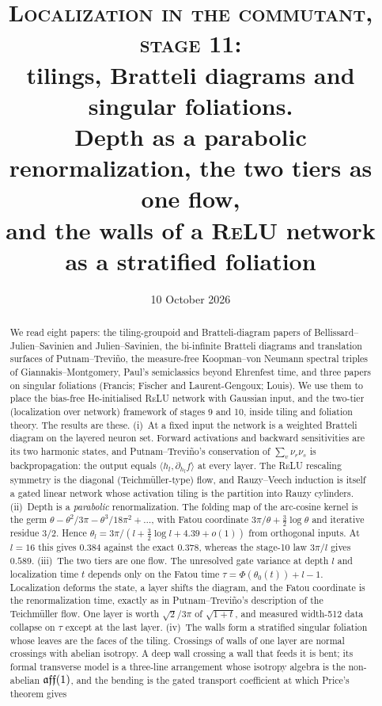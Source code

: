 \documentclass[11pt]{article}
\title{\textsc{Localization in the commutant, stage 11:}\\ \large tilings, Bratteli diagrams and singular foliations.\\
Depth as a parabolic renormalization, the two tiers as one flow,\\ and the walls of a \textsc{ReLU} network as a stratified foliation}
\author{}
\date{10 October 2026}
\theoremstyle{plain}
\theoremstyle{definition}\newtheorem{definition}[theorem]{Definition}\newtheorem{remark}[theorem]{Remark}
\begin{document}
\maketitle
\begin{abstract}
We read eight papers: the tiling-groupoid and Bratteli-diagram papers of Bellissard--Julien--Savinien and Julien--Savinien, the
bi-infinite Bratteli diagrams and translation surfaces of Putnam--Trevi\~no, the measure-free Koopman--von Neumann spectral triples
of Giannakis--Montgomery, Paul's semiclassics beyond Ehrenfest time, and three papers on singular foliations (Francis; Fischer and
Laurent-Gengoux; Louis). We use them to place the bias-free He-initialised \textsc{ReLU} network with Gaussian input, and the
two-tier (localization over network) framework of stages 9 and 10, inside tiling and foliation theory. The results are these.
(i)~At a fixed input the network is a weighted Bratteli diagram on the layered neuron set. Forward activations and backward
sensitivities are its two harmonic states, and Putnam--Trevi\~no's conservation of $\sum_v\nu_r\nu_s$ is backpropagation: the
output equals $\langle h_l,\partial_{h_l}f\rangle$ at every layer. The \textsc{ReLU} rescaling symmetry is the diagonal
(Teichm\"uller-type) flow, and Rauzy--Veech induction is itself a gated linear network whose activation tiling is the partition into
Rauzy cylinders. (ii)~Depth is a \emph{parabolic} renormalization. The folding map of the arc-cosine kernel is the germ
$\theta-\theta^2/3\pi-\theta^3/18\pi^2+\dots$, with Fatou coordinate $3\pi/\theta+\tfrac32\log\theta$ and iterative residue $3/2$. Hence
$\theta_l=3\pi/(l+\tfrac32\log l+4.39+o(1))$ from orthogonal inputs. At $l=16$ this gives $0.384$ against the exact $0.378$, whereas
the stage-10 law $3\pi/l$ gives $0.589$. (iii)~The two tiers are one flow. The unresolved gate variance at depth $l$ and localization
time $t$ depends only on the Fatou time $\tau=\Phi(\theta_0(t))+l-1$. Localization deforms the state, a layer shifts the diagram,
and the Fatou coordinate is the renormalization time, exactly as in Putnam--Trevi\~no's description of the Teichm\"uller flow. One
layer is worth $\sqrt2/3\pi$ of $\sqrt{1+t}$, and measured width-512 data collapse on $\tau$ except at the last layer. (iv)~The walls form
a stratified singular foliation whose leaves are the faces of the tiling. Crossings of walls of one layer are normal crossings with
abelian isotropy. A deep wall crossing a wall that feeds it is bent; its formal transverse model is a three-line arrangement whose
isotropy algebra is the non-abelian $\mathfrak{aff}(1)$, and the bending is the gated transport coefficient at which Price's theorem gives

\end{abstract}
\end{document}
